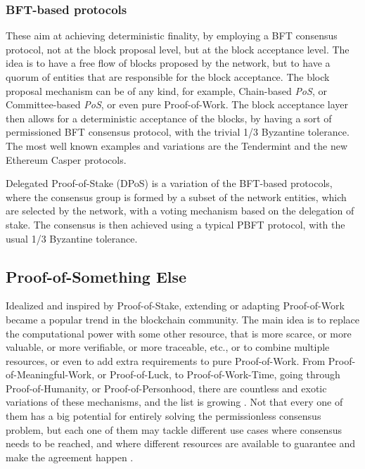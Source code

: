 \documentclass[journal]{IEEEtran}
\begin{document}
\subsubsection{BFT-based protocols}

These aim at achieving deterministic finality, by employing a BFT
consensus protocol, not at the block proposal level, but at the
block acceptance level. The idea is to have a free flow of blocks
proposed by the network, but to have a quorum of entities that
are responsible for the block acceptance. The block proposal mechanism
can be of any kind, for example, Chain-based \emph{PoS}, or Committee-based \emph{PoS},
or even pure Proof-of-Work. The block acceptance layer then allows
for a deterministic acceptance of the blocks, by having a sort of permissioned
BFT consensus protocol, with the trivial 1/3 Byzantine tolerance. The most well known examples
and variations are the Tendermint \cite{buchman2016tendermint} and the new Ethereum Casper 
\cite{buterin2017casper} protocols.

Delegated Proof-of-Stake (DPoS) is a variation of the BFT-based protocols,
where the consensus group is formed by a subset of the network entities,
which are selected by the network, with a voting mechanism based on the
delegation of stake. The consensus is then achieved using a typical 
PBFT protocol, with the usual 1/3 Byzantine tolerance.

\subsection{Proof-of-Something Else}

Idealized and inspired by Proof-of-Stake, extending or adapting Proof-of-Work
became a popular trend in the blockchain community. The main idea is to
replace the computational power with some other resource, that is
more scarce, or more valuable, or more verifiable, or more traceable, etc.,
or to combine multiple resources, or even to add extra requirements to 
pure Proof-of-Work. From Proof-of-Meaningful-Work, or Proof-of-Luck, 
to Proof-of-Work-Time, going through Proof-of-Humanity, or Proof-of-Personhood, there
are countless and exotic variations of these mechanisms, and the list is growing \cite{token-economy-gitbook}.
Not that every one of them has a big potential for entirely solving the permissionless consensus problem,
but each one of them may tackle different use cases where consensus needs to be reached, 
and where different resources are available to guarantee and make the agreement happen \cite{BOURAGA2021114384}.
\end{document}
